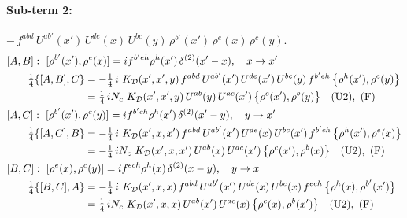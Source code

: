 \documentclass[10pt]{article}
\numberwithin{equation}{section}
\begin{document}
\paragraph{Sub-term 2:} $-\,f^{abd}\,U^{ab'}(x')\,U^{de}(x)\,U^{bc}(y)\,\rho^{b'}(x')\,\rho^{e}(x)\,\rho^{c}(y)$.
\begin{align}
&[A,B]:\ [\rho^{b'}(x'),\rho^{e}(x)]=i f^{b'eh}\rho^{h}(x')\,\delta^{(2)}(x'-x),\quad x\to x'\notag\\
&\qquad \tfrac14\{[A,B],C\}=-\tfrac14\,i\,\,K_{\mathcal D}(x',x',y)\,f^{abd}\,U^{ab'}(x')\,U^{de}(x')\,U^{bc}(y)\,f^{b'eh}\,\big\{\rho^{h}(x'),\rho^{c}(y)\big\}\notag\\
&\qquad\phantom{\tfrac14\{[A,B],C\}}=\tfrac14\,i N_{c}\,\,K_{\mathcal D}(x',x',y)\,U^{ab}(y)\,U^{ac}(x')\,\big\{\rho^{c}(x'),\rho^{b}(y)\big\}\quad\text{(U2)},\ \text{(F)}
\label{T:eq:D-2-AB}\\
&[A,C]:\ [\rho^{b'}(x'),\rho^{c}(y)]=i f^{b'ch}\rho^{h}(x')\,\delta^{(2)}(x'-y),\quad y\to x'\notag\\
&\qquad \tfrac14\{[A,C],B\}=-\tfrac14\,i\,\,K_{\mathcal D}(x',x,x')\,f^{abd}\,U^{ab'}(x')\,U^{de}(x)\,U^{bc}(x')\,f^{b'ch}\,\big\{\rho^{h}(x'),\rho^{e}(x)\big\}\notag\\
&\qquad\phantom{\tfrac14\{[A,C],B\}}=-\tfrac14\,i N_{c}\,\,K_{\mathcal D}(x',x,x')\,U^{ab}(x)\,U^{ac}(x')\,\big\{\rho^{c}(x'),\rho^{b}(x)\big\}\quad\text{(U2)},\ \text{(F)}
\label{T:eq:D-2-AC}\\
&[B,C]:\ [\rho^{e}(x),\rho^{c}(y)]=i f^{ech}\rho^{h}(x)\,\delta^{(2)}(x-y),\quad y\to x\notag\\
&\qquad \tfrac14\{[B,C],A\}=-\tfrac14\,i\,\,K_{\mathcal D}(x',x,x)\,f^{abd}\,U^{ab'}(x')\,U^{de}(x)\,U^{bc}(x)\,f^{ech}\,\big\{\rho^{h}(x),\rho^{b'}(x')\big\}\notag\\
&\qquad\phantom{\tfrac14\{[B,C],A\}}=\tfrac14\,i N_{c}\,\,K_{\mathcal D}(x',x,x)\,U^{ab}(x')\,U^{ac}(x)\,\big\{\rho^{c}(x),\rho^{b}(x')\big\}\quad\text{(U2)},\ \text{(F)}
\label{T:eq:D-2-BC}
\end{align}
\end{document}
